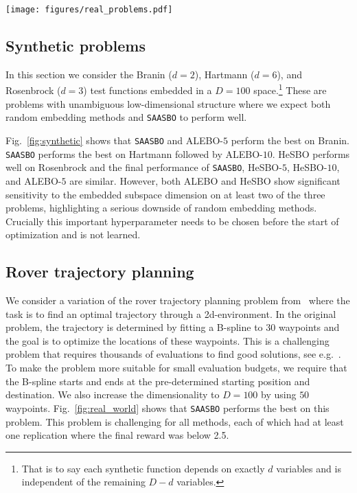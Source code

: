 \documentclass[accepted]{uai2021} %
\newcommand{\algoname}{{\texttt {SAASBO}}}
\begin{document}
\begin{figure*}[!ht]
    \centering
    \texttt{[image: figures/real\_problems.pdf]}
      \caption{We compare \algoname{} to baseline methods on rover trajectory planning ($D=100$),
               SVM hyperparameter tuning ($D=388$), and MOPTA vehicle design ($D=124$).
               We do $30$ independent replications for Rover and SVM and $15$ replications for MOPTA.
      {\bf Top row:} For each method we depict the mean value of the best minimum found at a given iteration.
      {\bf Bottom row:} For each method we depict the distribution over the final approximate minimum $y_{\rm min}$ encoded as
      a violin plot, with horizontal bars corresponding to $5$\%, $50$\%, and $95$\% quantiles.
    }
    \label{fig:real_world}
  \end{figure*}


\subsection{Synthetic problems}
\label{sec:sec_synthetic}

In this section we consider the Branin ($d=2$), Hartmann ($d=6$), and Rosenbrock ($d=3$)
test functions embedded in a $D=100$ space.\footnote{That is to say each synthetic function depends on exactly $d$ variables and is independent of the remaining $D-d$ variables.}
These are problems with unambiguous low-dimensional structure where we expect both random embedding methods and \algoname{} to
perform well.

Fig.~\ref{fig:synthetic} shows that \algoname{} and ALEBO-$5$ perform the best on Branin.
\algoname{} performs the best on Hartmann followed by ALEBO-$10$.
HeSBO performs well on Rosenbrock and the final performance of \algoname, HeSBO-$5$, HeSBO-$10$, and ALEBO-$5$ are similar.
However, both ALEBO and HeSBO show significant sensitivity to the embedded subspace dimension on at least two of the three problems, highlighting a serious downside of random embedding methods. Crucially this important hyperparameter needs to be chosen before the start of optimization and is not learned.


\subsection{Rover trajectory planning}
\label{sec:sec_rover}
We consider a variation of the rover trajectory planning problem from~\citep{wang2018batched} where the task is to find an optimal trajectory through a 2d-environment.
In the original problem, the trajectory is determined by fitting a B-spline to $30$ waypoints and the goal is to optimize the locations of these waypoints.
This is a challenging problem that requires thousands of evaluations to find good solutions, see e.g.~\citep{turbo}.
To make the problem more suitable for small evaluation budgets, we require that the B-spline starts and ends at the pre-determined starting position and destination.
We also increase the dimensionality to $D=100$ by using $50$ waypoints.
Fig.~\ref{fig:real_world} shows that \algoname{} performs the best on this problem.
This problem is challenging for all methods, each of which had at least one replication where the final reward was below 2.5.
\end{document}
